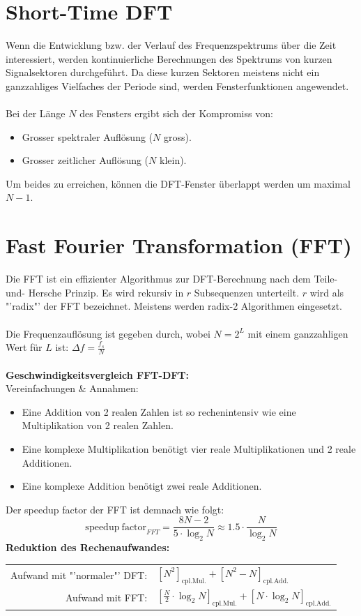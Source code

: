 \section{Short-Time DFT}
Wenn die Entwicklung bzw. der Verlauf des Frequenzspektrums über die Zeit interessiert, werden
kontinuierliche Berechnungen des Spektrums von kurzen Signalsektoren 
durchgeführt. Da diese kurzen Sektoren meistens nicht ein ganzzahliges 
Vielfaches der Periode sind, werden Fensterfunktionen angewendet.\\
\\
Bei der Länge $N$ des Fensters ergibt sich der Kompromiss von:
\begin{itemize}[noitemsep,topsep=3pt]
	\item Grosser spektraler Auflösung ($N$ gross).
	\item Grosser zeitlicher Auflösung ($N$ klein).
\end{itemize}
Um beides zu erreichen, können die DFT-Fenster überlappt werden um maximal
$N-1$.

\section{Fast Fourier Transformation (FFT)}
Die FFT ist ein effizienter Algorithmus zur DFT-Berechnung nach dem Teile-und-
Hersche Prinzip. Es wird rekursiv in $r$ Subsequenzen unterteilt. $r$ wird als 
"'radix"' der FFT bezeichnet. Meistens werden radix-2 Algorithmen eingesetzt.\\\\
Die Frequenzauflösung ist gegeben durch, wobei $N = 2^L$ mit einem ganzzahligen Wert für $L$ ist: 
$\Delta f = \frac{f_s}{N}$\\\\
\textbf{Geschwindigkeitsvergleich FFT-DFT:\\}
Vereinfachungen \& Annahmen:
\begin{itemize}[noitemsep,topsep=3pt]
	\item Eine Addition von 2 realen Zahlen ist so rechenintensiv wie eine Multiplikation von 2 realen Zahlen.
	\item Eine komplexe Multiplikation benötigt vier reale Multiplikationen und 2 reale Additionen.
	\item Eine komplexe Addition benötigt zwei reale Additionen.
\end{itemize}
Der speedup factor der FFT ist demnach wie folgt:
\[ \mathrm{speedup\ factor}_{FFT} = \frac{8N-2}{5\cdot \log_2N} \approx 1.5 \cdot	
	\frac{N}{\log_2N} \]
\textbf{Reduktion des Rechenaufwandes:}
\begin{table}[H]
\centering
\begin{tabular}{rl}
Aufwand mit "'normaler"' DFT: & $\left[N^2\right]_\textrm{cpl.Mul.} + \left[N^2-N\right]_\textrm{cpl.Add.}$ \\ 
Aufwand mit FFT: & $\left[\frac{N}{2}\cdot\log_2N\right]_\textrm{cpl.Mul.} + \left[N\cdot\log_2N\right]_\textrm{cpl.Add.}$
\end{tabular}
\end{table}

